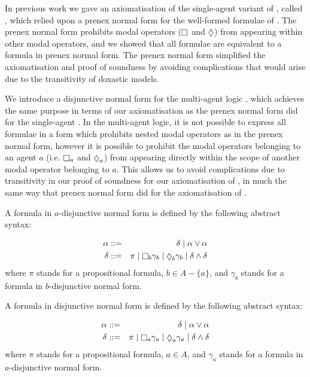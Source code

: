 
In previous work we gave an axiomatisation of the single-agent variant of
\logicKDF{}, called \logicKDiF{}, which relied upon a prenex normal form for the
well-formed formulae of \logicKDi{}. The prenex normal form prohibits modal
operators ($\knows$ and $\suspects$) from appearing within other modal
operators, and we showed that all \logicKDi{} formulae are equivalent to a
formula in prenex normal form. The prenex normal form simplified the
axiomatisation and proof of soundness by avoiding complications that would
arise due to the transitivity of doxastic models.

We introduce a disjunctive normal form for the multi-agent logic \logicKD{},
which achieves the same purpose in terms of our axiomatisation as the prenex
normal form did for the single-agent \logicKD{}. In the multi-agent logic, it is
not possible to express all formulae in a form which prohibits nested modal
operators as in the prenex normal form, however it is possible to prohibit the
modal operators belonging to an agent $a$ (i.e. $\knows_a$ and $\suspects_a$)
from appearing directly within the scope of another modal operator belonging to
$a$. This allows us to avoid complications due to transitivity in our proof of
soundness for our axiomatisation of \logicKDF{}, in much the same way that
prenex normal form did for the axiomatisation of \logicKDiF{}.

\begin{definition}
A formula in $a$-disjunctive normal form is defined by the following abstract syntax:

\begin{eqnarray*}
\alpha &::=& \delta \bnfalt \alpha \lor \alpha\\
\delta &::=& \pi \bnfalt \knows_b \gamma_b \bnfalt \suspects_b \gamma_b \bnfalt
\delta \land \delta\\
\end{eqnarray*}
where $\pi$ stands for a propositional formula, $b \in A - \{a\}$, and
$\gamma_b$ stands for a formula in $b$-disjunctive normal form.

A formula in disjunctive normal form is defined by the following abstract syntax:

\begin{eqnarray*}
\alpha &::=& \delta \bnfalt \alpha \lor \alpha\\
\delta &::=& \pi \bnfalt \knows_a \gamma_a \bnfalt \suspects_a \gamma_a \bnfalt
\delta \land \delta\\
\end{eqnarray*}
where $\pi$ stands for a propositional formula, $a \in A$, and $\gamma_a$
stands for a formula in $a$-disjunctive normal form.
\end{definition}

